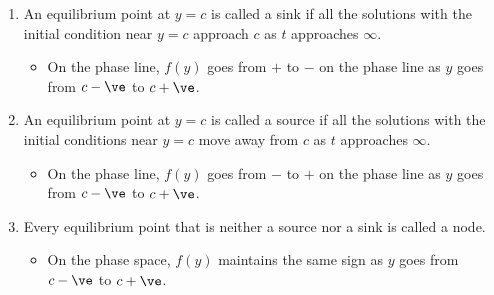 \documentclass[10pt]{mypackage}
\begin{document}
\begin{definition}\hfill
  \begin{enumerate}[(1)]
    \item An equilibrium point at $y=c$ is called a sink if all the solutions with the initial condition near $y = c$ approach $c$ as $t$ approaches $\infty$.
      \begin{itemize}
        \item On the phase line, $f(y)$ goes from $+$ to $-$ on the phase line as $y$ goes from $c - \ve$  to $c + \ve$.
      \end{itemize}
    \item An equilibrium point at $y=c$ is called a source if all the solutions with the initial conditions near $y = c$ move away from $c$ as $t$ approaches $\infty$.
      \begin{itemize}
        \item On the phase line, $f(y)$ goes from $-$ to $+$ on the phase line as $y$ goes from $c-\ve$ to $c + \ve$.
      \end{itemize}
    \item Every equilibrium point that is neither a source nor a sink is called a node.
      \begin{itemize}
        \item On the phase space, $f(y)$ maintains the same sign as $y$ goes from $c - \ve$ to $c + \ve$.
      \end{itemize}
  \end{enumerate}
\end{definition}
\end{document}
